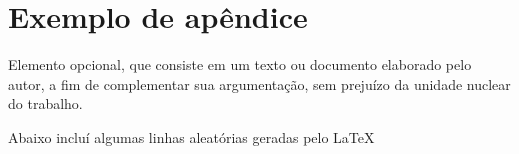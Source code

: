 \chapter{Exemplo de apêndice}

Elemento opcional, que consiste em um texto ou 
documento elaborado pelo autor, a fim de complementar sua argumentação,  sem prejuízo da unidade nuclear do trabalho. 

Abaixo incluí algumas linhas aleatórias geradas pelo \LaTeX

\lipsum[2-9]
